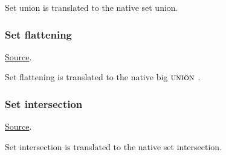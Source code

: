 \begin{mathpar}
\end{mathpar}
Set union is translated to the \tlap{} native set union.

\subsubsection{ Set flattening}
\href{https://github.com/saltiniroberto/ssf/blob/7ea6e18093d9da3154b4e396dd435549f687e6b9/high_level/common/pythonic_code_generic.py#L35-L36}{Source}.



\begin{mathpar}
\end{mathpar}
Set flattening is translated to the \tlap{} native big $\UNION$.

\subsubsection{Set intersection}
\href{https://github.com/saltiniroberto/ssf/blob/7ea6e18093d9da3154b4e396dd435549f687e6b9/high_level/common/pythonic_code_generic.py#L42-L43}{Source}.



\begin{mathpar}
\end{mathpar}
Set intersection is translated to the \tlap{} native set intersection.

